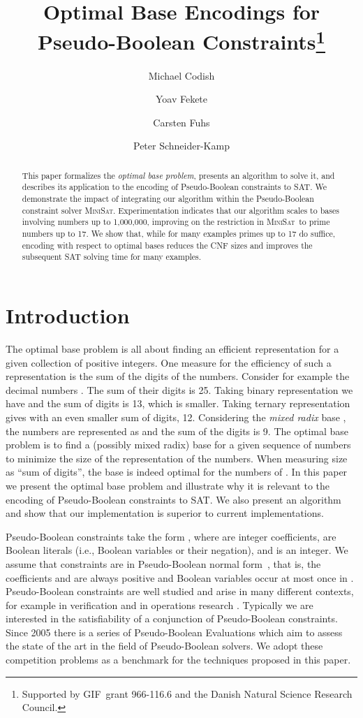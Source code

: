 \documentclass[envcountsame]{llncs}
\title{Optimal Base Encodings for\\
       Pseudo-Boolean Constraints\thanks{Supported by GIF\ grant
       966-116.6 and the Danish Natural Science Research Council.}
       }
\author{    Michael Codish\inst{1}
            \and
            Yoav Fekete\inst{1}
            \and
            Carsten Fuhs\inst{2}
            \and
            Peter Schneider-Kamp\inst{3}
}
\institute{
	Department of Computer Science, 
        Ben Gurion University of the Negev, Israel
\and 	  
	LuFG Informatik 2, RWTH Aachen University, Germany 
\and 	  
        IMADA, University of Southern Denmark, Denmark
}
\newcommand\minisatp{\textsc{MiniSat}}
\begin{document}
\maketitle

\begin{abstract}
  This paper formalizes the \emph{optimal base problem}, presents an
  algorithm to solve it, and describes its application to the encoding
  of Pseudo-Boolean constraints to SAT.  We demonstrate the impact of
  integrating our algorithm within the Pseudo-Boolean constraint
  solver \minisatp.  Experimentation indicates that our algorithm
  scales to bases involving numbers up to 1,000,000, improving on the
  restriction in \minisatp\ to prime numbers up to 17.  We show that,
  while for many examples primes up to 17 do suffice, encoding with
  respect to optimal bases 
reduces the CNF sizes and improves the subsequent SAT solving
  time for many examples.
\end{abstract}

\section{Introduction}

The optimal base problem is all about finding an efficient
representation for a given collection of positive integers. One
measure for the efficiency of such a representation is the sum of the
digits of the numbers.  Consider for example the decimal numbers
. The sum of their digits is 25.  Taking binary
representation we have   and
the sum of digits is 13, which is smaller. Taking ternary
representation gives  with an even
smaller sum of digits, 12. Considering the \emph{mixed radix} base
, the numbers are represented as 
 and the sum of the digits is 9.  The optimal base
problem is to find a (possibly mixed radix) base for a given sequence
of numbers to minimize the size of the representation of the
numbers. When measuring size as ``sum of digits'', the base  is
indeed optimal for the numbers of . In this paper we present the
optimal base problem and illustrate why it is relevant to the encoding
of Pseudo-Boolean constraints to SAT.
We also present an algorithm and show that our implementation is
superior to current implementations.

Pseudo-Boolean constraints take the form , where  are integer coefficients,
 are Boolean literals (i.e., Boolean variables or
their negation), and  is an integer.  We assume that constraints
are in Pseudo-Boolean normal form~\cite{Barth95}, that is, the
coefficients  and  are always positive and Boolean
variables occur at most once in .
Pseudo-Boolean constraints are well studied and arise in many
different contexts, for example in verification \cite{Bryant02} and in
operations research \cite{Bixby92}.  Typically we are interested in
the satisfiability of a conjunction of Pseudo-Boolean constraints.
Since 2005 there is a series of Pseudo-Boolean Evaluations
\cite{Manquinho06} 
which aim to assess the state of the art in the field of
Pseudo-Boolean solvers. We adopt these competition problems as a
benchmark for the techniques proposed in this paper.
\end{document}
